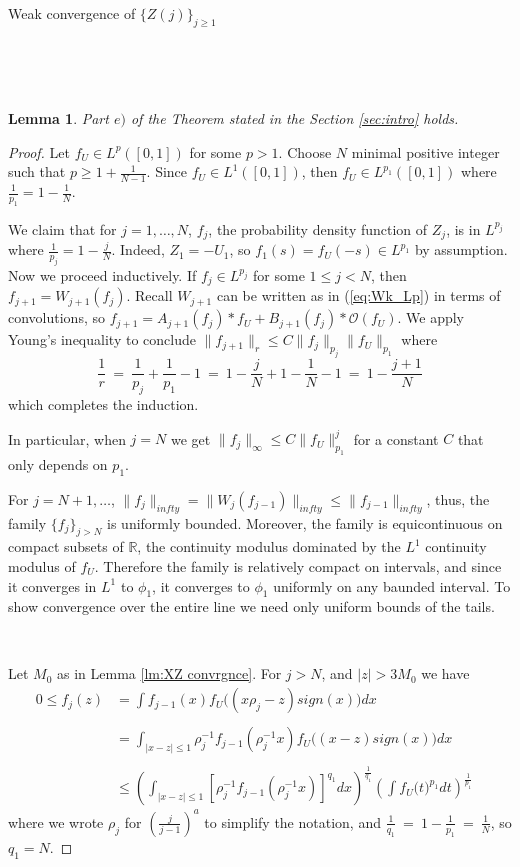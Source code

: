 \documentclass[12pt]{article}
\newtheorem{lemma}[theorem]{Lemma}
\begin{document}
\begin{section}{Weak convergence of $\{Z(j)\}_{j \ge 1}$ }
\  

\  

\  

\begin{lemma}
	Part $e)$ of the Theorem stated in the Section \ref{sec:intro} holds.
\end{lemma}
\begin{proof}
Let $f_U \in L^{p}([0,1])$ for some $p>1$. Choose $N$ minimal positive integer such that $p  \ge 1 + \frac{1}{N-1}$. Since $f_U \in L^1([0,1])$, then $f_U \in L^{p_1}([0,1])$ where $\frac{1}{p_1} = 1 - \frac{1}{N}$.

We claim that for $j=1,\dots , N$, $f_j$, the probability density function of $Z_j$, is in $L^{p_j}$ where $\frac{1}{p_j} = 1 - \frac{j}{N}$. Indeed, $Z_1 = -U_1$, so $f_1(s) = f_U(-s) \in L^{p_1}$ by assumption. Now we proceed inductively. If $f_j  \in L^{p_j}$ for some $1 \le j < N$, then $f_{j+1} = W_{j+1}(f_j)$. Recall $W_{j+1}$ can be written as in (\ref{eq:Wk_Lp}) in terms of convolutions, so $ f_{j+1} = A_{j+1}(f_j)*f_U + B_{j+1}(f_j)*\mathcal{O}(f_U)$. We apply Young's inequality to conclude $\|f_{j+1}\|_r \le C \|f_j\|_{p_j} \|f_U\|_{p_1}$ where  
$$
\frac{1}{r} ~=~ \frac{1}{p_j} + \frac{1}{p_1} - 1 ~=~ 1 - \frac{j}{N} + 1 - \frac{1}{N} -1 ~=~ 1 - \frac{j+1}{N}
$$ 
which completes the induction.  

In particular, when $j=N$ we get $\|f_j\|_{\infty} \le C \|f_U\|_{p_1}^j$ for a constant $C$ that only depends on $p_1$.  

For $j=N+1,\dots$, $\|f_j\|_{infty} = \|W_j(f_{j-1})\|_{infty} \le \|f_{j-1}\|_{infty}$, thus, the family $\{f_j\}_{j>N}$ is uniformly bounded. Moreover, the family is equicontinuous on compact subsets of $\mathbb{R}$, the continuity modulus dominated by the $L^1$ continuity modulus of $f_U$. Therefore the family is relatively compact on intervals, and since it converges in $L^1$ to $\phi_1$, it converges to $\phi_1$ uniformly on any baunded interval. To show convergence over the entire line we need only uniform bounds of the tails.  

\  

Let $M_0$ as in Lemma \ref{lm:XZ convrgnce}. For $j > N$, and $ |z| > 3 M_0$ we have
\begin{align*}
0 \le f_j(z) &= \int f_{j-1}(x) f_U\!\big( (x \rho_j - z)sign(x)  \big) dx &\\
&\  &\\
&=\int_{|x-z|\le 1} \rho_j^{-1} f_{j-1}(\rho_j^{-1}x) f_U\!\big( (x - z)sign(x)  \big) dx & \\
&\  &\\
& \le \left( \int_{|x-z|\le 1} \left[ \rho_j^{-1} f_{j-1}(\rho_j^{-1}x) \right]^{q_1}  dx \right)^{\frac{1}{q_1}} 
\left( \int  f_U\!\big( t  \big)^{p_1} dt \right)^{\frac{1}{p_1}} &
\end{align*}
where we wrote $\rho_j$ for $ \left( \frac{j}{j-1}\right)^a$ to simplify the notation, and $\frac{1}{q_1} ~=~ 1 - \frac{1}{p_1} ~=~ \frac{1}{N}$, so $q_1=N$.  


\end{proof}
\end{section}
\end{document}

